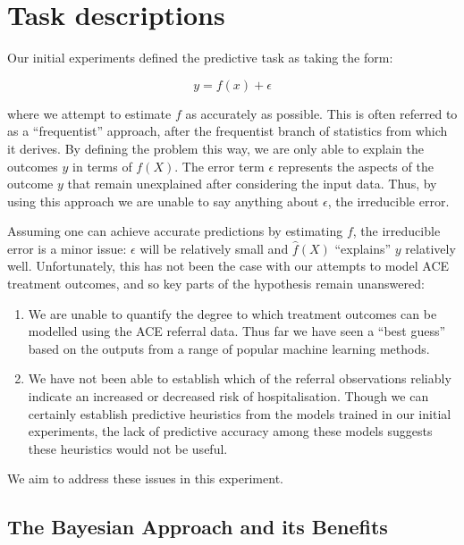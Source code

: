 \section{Task descriptions}\label{sec:task-descriptions}

Our initial experiments defined the predictive task as taking the form:

\begin{equation}
    y = f(x) + \epsilon\label{eq:equation2}
\end{equation}

where we attempt to estimate $f$ as accurately as possible. This is often referred to as a ``frequentist'' approach, after the frequentist branch of statistics from which it derives. By defining the problem this way, we are only able to explain the outcomes $y$ in terms of $f(X)$. The error term $\epsilon$ represents the aspects of the outcome $y$ that remain unexplained after considering the input data. Thus, by using this approach we are unable to say anything about $\epsilon$, the irreducible error.

Assuming one can achieve accurate predictions by estimating $f$, the irreducible error is a minor issue: $\epsilon$ will be relatively small and $\hat{f}(X)$ ``explains'' $y$ relatively well. Unfortunately, this has not been the case with our attempts to model ACE treatment outcomes, and so key parts of the hypothesis remain unanswered:

\begin{enumerate}
    \item We are unable to quantify the degree to which treatment outcomes can be modelled using the ACE referral data. Thus far we have seen a ``best guess'' based on the outputs from a range of popular machine learning methods.
    \item We have not been able to establish which of the referral observations reliably indicate an increased or decreased risk of hospitalisation. Though we can certainly establish predictive heuristics from the models trained in our initial experiments, the lack of predictive accuracy among these models suggests these heuristics would not be useful.
\end{enumerate}

We aim to address these issues in this experiment.

\subsection{The Bayesian Approach and its Benefits}\label{subsec:the-bayesian-approach-and-its-benefits}


